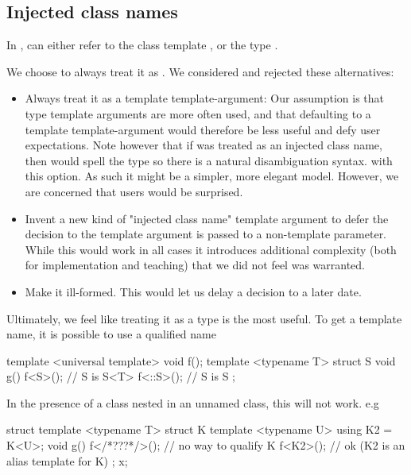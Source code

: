 \documentclass{wg21}
\begin{document}
\subsection{Injected class names}

In ,  can either refer to the class template , or the type .

We choose to always treat it as .
We considered and rejected these alternatives:

\begin{itemize}
\item Always treat it as a template template-argument: Our assumption is that type template arguments are more often used, and that defaulting to a template template-argument would therefore be less useful and defy user expectations.
Note however that if  was treated as an injected class name, then  would spell the type so there is a natural disambiguation syntax.
with this option. As such it might be a simpler, more elegant model. However, we are concerned that users would be surprised.

\item Invent a new kind of "injected class name" template argument to defer the decision to the template argument is passed to a non-template parameter.
While this would work in all cases it introduces additional complexity (both for implementation and teaching) that we did not feel was warranted.
\item Make it ill-formed. This would let us delay a decision to a later date.
\end{itemize}

Ultimately, we feel like treating it as a type is the most useful.
To get a template name, it is possible to use a qualified name


\begin{colorblock}
template <universal template>
void f();
template <typename T>
struct S {
    void g() {
        f<S>(); // S is S<T>
        f<::S>(); // S is S
    }
};
\end{colorblock}

In the presence of a class nested in an unnamed class, this will not work.
e.g

\begin{colorblock}
struct {
    template <typename T>
    struct K {
        template <typename U>
        using K2 = K<U>;
        void g() {
            f</*???*/>(); // no way to qualify K
            f<K2>(); // ok (K2 is an alias template for K)
        }
    };
} x;
\end{colorblock}
\end{document}
